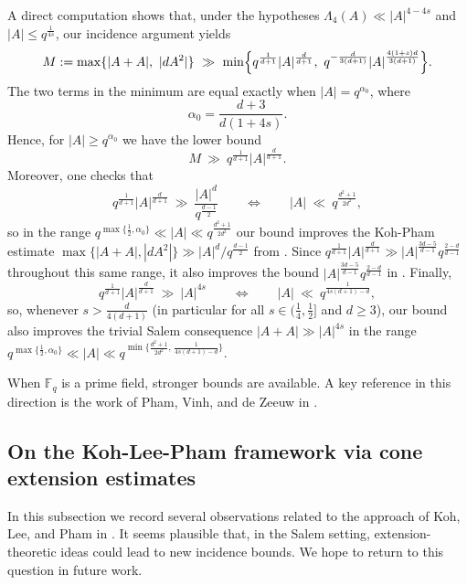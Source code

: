\documentclass{article}
\begin{document}
A direct computation shows that, under the hypotheses $\Lambda_4(A)\ll |A|^{4-4s}$ and $|A|\le q^{\frac{1}{4s}}$, our incidence argument yields
\[
M:=\max\{|A+A|,\ |dA^2|\}
\ \gg\
\min\Bigl\{q^{\frac1{d+1}}|A|^{\frac{d}{d+1}},\ q^{-\frac{d}{3(d+1)}}|A|^{\frac{4(1+s)d}{3(d+1)}}\Bigr\}.
\]
The two terms in the minimum are equal exactly when $|A|=q^{\alpha_0}$, where
\[
\alpha_0=\frac{d+3}{d(1+4s)}.
\]
Hence, for $|A|\ge q^{\alpha_0}$ we have the lower bound
\[
M\ \gg\ q^{\frac1{d+1}}|A|^{\frac{d}{d+1}}.
\]
Moreover, one checks that
\[
q^{\frac1{d+1}}|A|^{\frac{d}{d+1}}
\ \gg\
\frac{|A|^d}{q^{\frac{d-1}{2}}}
\qquad\Longleftrightarrow\qquad
|A|\ \ll\ q^{\frac{d^2+1}{2d^2}},
\]
so in the range $q^{\max\{\frac12,\alpha_0\}}\ll |A|\ll q^{\frac{d^2+1}{2d^2}}$ our bound improves the Koh-Pham estimate
$\max\{|A+A|,|dA^2|\}\gg |A|^d/q^{ \frac{d-1}{2}}$ from \cite[Corollary~9]{Kohpham}.
Since $q^{\frac1{d+1}}|A|^{\frac{d}{d+1}}
\gg
|A|^{\frac{3d-5}{d-1}}q^{\frac{2-d}{d-1}}$ throughout this same range, it also improves the bound
$|A|^{\frac{3d-5}{d-1}}q^{\frac{2-d}{d-1}}$ in \cite{Hpham}.
Finally,
\[
q^{\frac1{d+1}}|A|^{\frac{d}{d+1}}
\ \gg\
|A|^{4s}
\qquad\Longleftrightarrow\qquad
|A|\ \ll\ q^{\frac{1}{4s(d+1)-d}},
\]
so, whenever $s>\frac{d}{4(d+1)}$ (in particular for all $s\in(\frac14,\frac12]$ and $d\ge 3$),
our bound also improves the trivial Salem consequence $|A+A|\gg |A|^{4s}$ in the range
$q^{\max \big\{\frac12,\alpha_0 \big\}}\ll |A|\ll q^{\min \big\{\frac{d^2+1}{2d^2},\,\frac{1}{4s(d+1)-d} \big\}}$.

When $\mathbb{F}_q$ is a prime field, stronger bounds are available. A key reference in this direction is the work of Pham, Vinh, and de Zeeuw in \cite{PVD}.



\subsection{On the Koh-Lee-Pham framework via cone extension estimates}
\label{subsec:KLP-framework}

In this subsection we record several observations related to the approach of Koh, Lee, and Pham in \cite{KLP22}. It seems plausible that, in the Salem setting, extension-theoretic ideas could lead to new incidence bounds. We hope to return to this question in future work.
\end{document}
